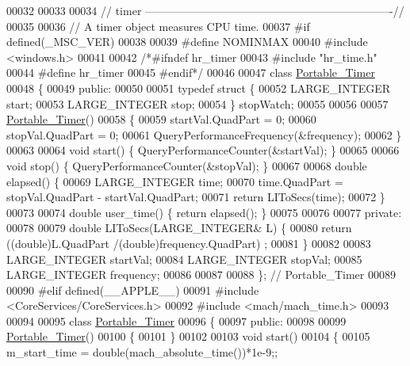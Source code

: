 \begin{DoxyCode}
00032 
00033 
00034 \textcolor{comment}{//  timer  -------------------------------------------------------------------//}
00035 
00036 \textcolor{comment}{//  A timer object measures CPU time.}
00037 \textcolor{preprocessor}{#if defined(\_MSC\_VER)}
00038 
00039 \textcolor{preprocessor}{#define NOMINMAX}
00040 \textcolor{preprocessor}{#include <windows.h>}
00041 
00042 \textcolor{comment}{/*#ifndef hr\_timer}
00043 \textcolor{comment}{#include "hr\_time.h"}
00044 \textcolor{comment}{#define hr\_timer}
00045 \textcolor{comment}{#endif*/}
00046 
00047  \textcolor{keyword}{class }\hyperlink{class_portable___timer}{Portable\_Timer}
00048  \{
00049   \textcolor{keyword}{public}:
00050 
00051    \textcolor{keyword}{typedef} \textcolor{keyword}{struct }\{
00052     LARGE\_INTEGER start;
00053     LARGE\_INTEGER stop;
00054    \} stopWatch;
00055 
00056 
00057    \hyperlink{class_portable___timer}{Portable\_Timer}()
00058    \{
00059      startVal.QuadPart = 0;
00060      stopVal.QuadPart = 0;
00061      QueryPerformanceFrequency(&frequency);
00062    \}
00063 
00064    \textcolor{keywordtype}{void} start() \{ QueryPerformanceCounter(&startVal); \}
00065 
00066    \textcolor{keywordtype}{void} stop() \{ QueryPerformanceCounter(&stopVal); \}
00067 
00068    \textcolor{keywordtype}{double} elapsed() \{
00069      LARGE\_INTEGER time;
00070      time.QuadPart = stopVal.QuadPart - startVal.QuadPart;
00071      \textcolor{keywordflow}{return} LIToSecs(time);
00072    \}
00073 
00074    \textcolor{keywordtype}{double} user\_time() \{ \textcolor{keywordflow}{return} elapsed(); \}
00075 
00076 
00077  \textcolor{keyword}{private}:
00078 
00079    \textcolor{keywordtype}{double} LIToSecs(LARGE\_INTEGER& L) \{
00080      \textcolor{keywordflow}{return} ((\textcolor{keywordtype}{double})L.QuadPart /(\textcolor{keywordtype}{double})frequency.QuadPart) ;
00081    \}
00082 
00083    LARGE\_INTEGER startVal;
00084    LARGE\_INTEGER stopVal;
00085    LARGE\_INTEGER frequency;
00086 
00087 
00088  \}; \textcolor{comment}{// Portable\_Timer}
00089 
00090 \textcolor{preprocessor}{#elif defined(\_\_APPLE\_\_)}
00091 \textcolor{preprocessor}{#include <CoreServices/CoreServices.h>}
00092 \textcolor{preprocessor}{#include <mach/mach\_time.h>}
00093 
00094 
00095 \textcolor{keyword}{class }\hyperlink{class_portable___timer}{Portable\_Timer}
00096 \{
00097  \textcolor{keyword}{public}:
00098 
00099   \hyperlink{class_portable___timer}{Portable\_Timer}()
00100   \{
00101   \}
00102 
00103   \textcolor{keywordtype}{void} start()
00104   \{
00105     m\_start\_time = double(mach\_absolute\_time())*1e-9;;

\end{DoxyCode}
